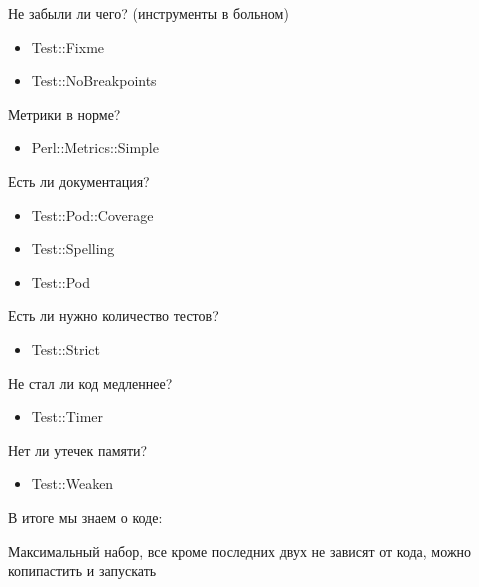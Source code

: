 \documentclass[aspectratio=169]{beamer}
\begin{document}
\begin{frame}{Не забыли ли чего? (инструменты в больном)}
\begin{itemize}
\item Test::Fixme
\item Test::NoBreakpoints
\end{itemize}
\end{frame}

\begin{frame}{Метрики в норме?}
\begin{itemize}
\item Perl::Metrics::Simple
\end{itemize}
\end{frame}

\begin{frame}{Есть ли документация?}
\begin{itemize}
\item Test::Pod::Coverage
\item Test::Spelling
\item Test::Pod
\end{itemize}
\end{frame}

\begin{frame}{Есть ли нужно количество тестов?}
\begin{itemize}
\item Test::Strict
\end{itemize}
\end{frame}

\begin{frame}{Не стал ли код медленнее?}
\begin{itemize}
\item Test::Timer
\end{itemize}
\end{frame}

\begin{frame}{Нет ли утечек памяти?}
\begin{itemize}
\item Test::Weaken
\end{itemize}
\end{frame}

\begin{frame}{В итоге мы знаем о коде:}

\end{frame}

\begin{frame}{}
Максимальный набор, все кроме последних двух не зависят от кода, можно копипастить и запускать
\end{frame}
\end{document}
